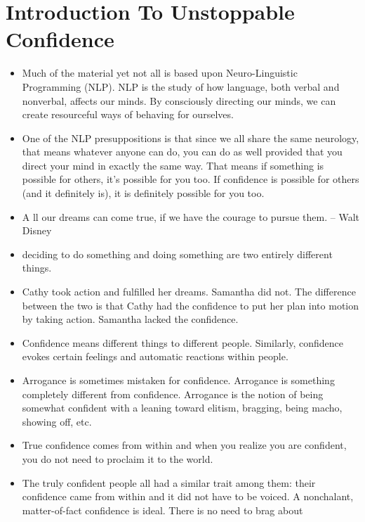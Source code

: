 \chapter*{Introduction To Unstoppable Confidence}

    \begin{itemize}
        \item Much of the material yet not all is based upon Neuro-Linguistic Programming (NLP).
        NLP is the study of how language, both verbal and nonverbal, affects our minds. By consciously
        directing our minds, we can create resourceful ways of behaving for ourselves.
        \item One of the NLP presuppositions is that since we all share the same neurology, that means whatever
        anyone can do, you can do as well provided that you direct your mind in exactly the same way. That
        means if something is possible for others, it’s possible for you too. If confidence is possible for
        others (and it definitely is), it is definitely possible for you too.
        \item A ll our dreams can come true, if we have the courage to pursue them. – Walt Disney
        \item deciding to do something and doing something are two entirely different things.
        \item Cathy took action and fulfilled her dreams. Samantha did not. The difference between the two is
        that Cathy had the confidence to put her plan into motion by taking action. Samantha lacked the
        confidence.
        \item Confidence means different things to different
        people. Similarly, confidence evokes certain feelings and automatic reactions within people.
        \item Arrogance is sometimes mistaken for confidence. Arrogance is something completely different from
        confidence. Arrogance is the notion of being somewhat confident with a leaning toward elitism,
        bragging, being macho, showing off, etc.
        \item True confidence
        comes from within and when you realize you are confident, you do not need to proclaim it to the
        world.
        \item The truly
        confident people all had a similar trait among them: their confidence came from within and it did not
        have to be voiced. A nonchalant, matter-of-fact confidence is ideal. There is no need to brag about

\end{itemize}
